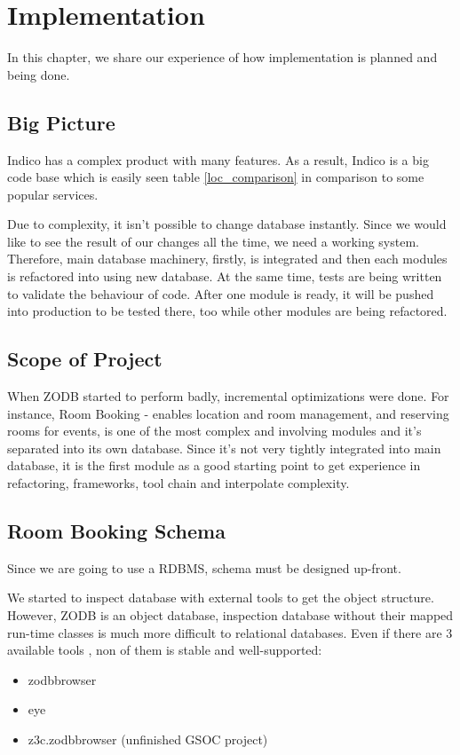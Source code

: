 \chapter{Implementation}

In this chapter, we share our experience of how implementation is planned and being done.

\section{Big Picture}

Indico has a complex product with many features. As a result, Indico is a big code base which is easily seen table \ref{loc_comparison} in comparison to some popular services.

Due to complexity, it isn't possible to change database instantly. Since we would like to see the result of our changes all the time, we need a working system. Therefore, main database machinery, firstly, is integrated and then each modules is refactored into using new database. At the same time, tests are being written to validate the behaviour of code. After one module is ready, it will be pushed into production to be tested there, too while other modules are being refactored.



\section{Scope of Project}

When ZODB started to perform badly, incremental optimizations were done. For instance, Room Booking - enables location and room management, and reserving rooms for events, is one of the most complex and involving modules and it's separated into its own database. Since it's not very tightly integrated into main database, it is the first module as a good starting point to get experience in refactoring, frameworks, tool chain and interpolate complexity.

\section{Room Booking Schema}

Since we are going to use a RDBMS, schema must be designed up-front.

We started to inspect database with external tools to get the object structure. However, ZODB is an object database, inspection database without their mapped run-time classes is much more difficult to relational databases. Even if there are 3 available tools , non of them is stable and well-supported:
\begin{itemize}
  \item zodbbrowser
  \item eye
  \item z3c.zodbbrowser (unfinished GSOC project)
\end{itemize}

